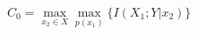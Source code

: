 \documentclass[preview]{standalone}
\begin{document}
\begin{center}
$C_0 = \underset{x_2 \in {X}}{\max} \underset{p(x_1)}{\max} \{I(X_1;Y|x_2)\}$
\end{center}
\end{document}
